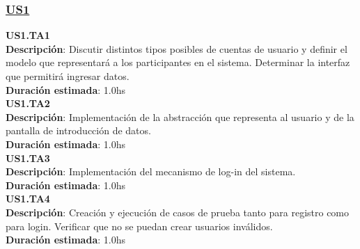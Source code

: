 \begin{tcolorbox}
\subsubsection*{\underline{US1}}
\textbf{US1.TA1} \\
\textbf{Descripción}: Discutir distintos tipos posibles de cuentas de usuario y definir el modelo que representará a los participantes en el sistema. Determinar la interfaz que permitirá ingresar datos.\\
\textbf{Duración estimada}: 1.0hs \\
\newline
\textbf{US1.TA2} \\
\textbf{Descripción}: Implementación de la abstracción que representa al usuario y de la pantalla de introducción de datos.\\
\textbf{Duración estimada}: 1.0hs \\
\newline
\textbf{US1.TA3} \\
\textbf{Descripción}: Implementación del mecanismo de log-in del sistema.\\
\textbf{Duración estimada}: 1.0hs \\
\newline
\textbf{US1.TA4} \\
\textbf{Descripción}: Creación y ejecución de casos de prueba tanto para registro como para login. Verificar que no se puedan crear usuarios inválidos. \\
\textbf{Duración estimada}: 1.0hs
\end{tcolorbox}
\vspace{10pt}


